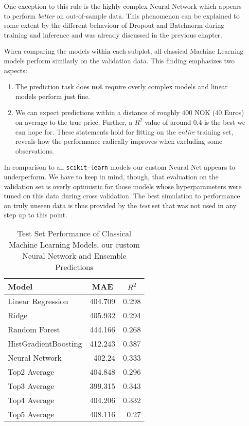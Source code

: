 One exception to this rule is the highly complex Neural Network which appears to perform \emph{better} on out-of-sample data.
This phenomenon can be explained to some extent by the different behaviour of Dropout and Batchnorm during training and inference and was already discussed in the previous chapter.

When comparing the models within each subplot, all classical Machine Learning models perform similarly on the validation data.
This finding emphasizes two aspects:
\begin{enumerate}
  \item The prediction task does \textbf{not} require overly complex models and linear models perform just fine.
  \item We can expect predictions within a distance of roughly $400$ NOK (40 Euros) on average to the true price.
        Further, a $R^2$ value of around $0.4$ is the best we can hope for.
        These statements hold for fitting on the \emph{entire} training set,  reveals how the performance radically improves when excluding some observations.
\end{enumerate}
In comparison to all \texttt{scikit-learn} models our custom Neural Net appears to underperform.
We have to keep in mind, though, that evaluation on the validation set is overly optimistic for those models whose hyperparameters were tuned on this data during cross validation.
The best simulation to performance on truly unseen data is thus provided by the \emph{test} set that was not used in any step up to this point.

\begin{table}[th]
  \centering
  \begin{tabular}{lrr}
    \hline
    Model                & \multicolumn{1}{c}{MAE} & \multicolumn{1}{c}{$R^2$} \\ \hline
    Linear Regression    & 404.709                 & 0.298                     \\
    Ridge                & 405.932                 & 0.294                     \\
    Random Forest        & 444.166                 & 0.268                     \\
    HistGradientBoosting & 412.243                 & 0.387                     \\
    Neural Network       & 402.24                  & 0.333                     \\
    Top2 Average         & 404.848                 & 0.296                     \\
    Top3 Average         & 399.315                 & 0.343                     \\
    Top4 Average         & 404.206                 & 0.332                     \\
    Top5 Average         & 408.116                 & 0.27                      \\ \hline
  \end{tabular}
  \caption{Test Set Performance of Classical Machine Learning Models, our custom Neural Network and Ensemble Predictions}
  \label{tab:test-set}
\end{table}

